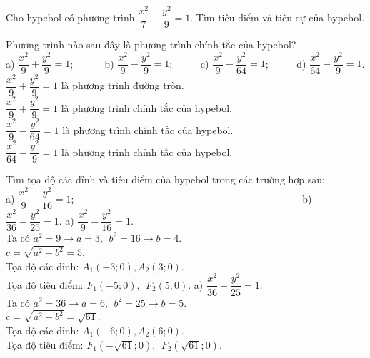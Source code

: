 \begin{bt}%
	Cho hypebol có phương trình $\dfrac{x^2}{7}-\dfrac{y^2}{9}=1$. Tìm tiêu điểm và tiêu cự của hypebol.
\end{bt}

\begin{bt}%
	Phương trình nào sau đây là phương trình chính tắc của hypebol?\\	
	a) $\dfrac{x^2}{9}+\dfrac{y^2}{9}=1$; ~~~~~
	b) $\dfrac{x^2}{9}-\dfrac{y^2}{9}=1$;~~~~~
	c) $\dfrac{x^2}{9}-\dfrac{y^2}{64}=1$;~~~~~
	d) $\dfrac{x^2}{64}-\dfrac{y^2}{9}=1$.
	\loigiai 
	{
		$\dfrac{x^2}{9}+\dfrac{y^2}{9}=1$ là phương trình đường tròn.\\
		$\dfrac{x^2}{9}+\dfrac{y^2}{9}=1$ là phương trình chính tắc của hypebol.\\
		$\dfrac{x^2}{9}-\dfrac{y^2}{64}=1$ là phương trình chính tắc của hypebol.\\
		$\dfrac{x^2}{64}-\dfrac{y^2}{9}=1$ là phương trình chính tắc của hypebol.
	}
\end{bt}

\begin{bt}%
	Tìm tọa độ các đỉnh và tiêu điểm của hypebol trong các trường hợp sau:\\
	a) $\dfrac{x^2}{9}-\dfrac{y^2}{16}=1$;~~~~~~~~~~~~~~~~~~~~~~~~~~~~~~~~~~~~~~~~~~~~~
	b) $\dfrac{x^2}{36}-\dfrac{y^2}{25}=1$.
	\loigiai 
	{
		a) $\dfrac{x^2}{9}-\dfrac{y^2}{16}=1$.\\
		Ta có $a^2=9\rightarrow a=3,  ~~b^2=16 \rightarrow b=4$.\\
		$c=\sqrt{a^2+b^2}=5$.\\
		Tọa độ các đỉnh: $A_1(-3;0), A_2(3;0)$.\\
		Tọa độ tiêu điểm: $F_1(-5;0),~~F_2(5;0)$.
		a) $\dfrac{x^2}{36}-\dfrac{y^2}{25}=1$.\\
		Ta có $a^2=36\rightarrow a=6,  ~~b^2=25 \rightarrow b=5$.\\
		$c=\sqrt{a^2+b^2}=\sqrt{61}$.\\
		Tọa độ các đỉnh: $A_1(-6;0), A_2(6;0)$.\\
		Tọa độ tiêu điểm: $F_1(-\sqrt{61};0),~~F_2(\sqrt{61};0)$.
	}
\end{bt}

